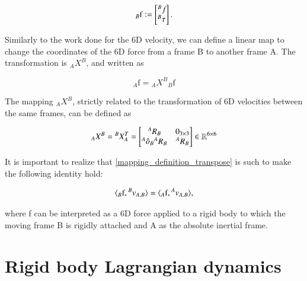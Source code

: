 \begin{equation} \label{def_force_6d}
    {}_B\text{f} \vcentcolon=
    \begin{bmatrix}
        {}^{B}{f}_{}\\
        {}^{B}{\mathcal{\tau}}_{}
    \end{bmatrix}.
\end{equation}

Similarly to the work done for the 6D velocity, we can define a linear map to change the coordinates of the 6D force from a frame B to another frame A. The transformation is ${}_AX^{B}$, and written as

\begin{equation} \label{force_change_frame}
    {}_A\text{f} = {}_AX^{B} {}_B\text{f}
\end{equation}

The mapping ${}_AX^{B}$, strictly related to the transformation of 6D velocities between the same frames, can be defined as 

\begin{equation} \label{mapping_definition_transpose}
{}_AX^B = {}^{B}{X}_{A}^T =
\begin{bmatrix}
    {}^{A}{R}_{B} & 0_{3\times 3}\\
    {}^{A}{\hat{o}}_{B}{}^{A}{R}_{B} & {}^{A}{R}_{B}
\end{bmatrix}
\in \mathbb{R}^{6\times 6}
\end{equation}

It is important to realize that \ref{mapping_definition_transpose} is such to make the following identity hold:

\begin{equation}
    \langle {}_B\text{f}, {}^{B}{v}_{A,B}\rangle = \langle {}_A\text{f}, {}^{A}{v}_{A,B} \rangle,
\end{equation}

where f can be interpreted as a 6D force applied to a rigid body to which the moving frame B is rigidly attached and A as the absolute inertial frame.\\



\section{Rigid body Lagrangian dynamics}

